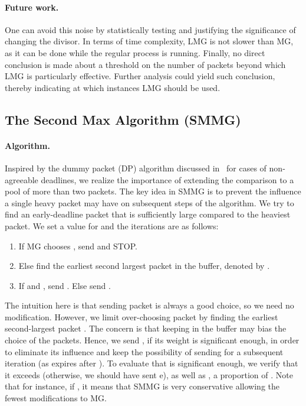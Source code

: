 \documentclass[oribibl]{llncs}
\begin{document}
\paragraph{Future work.} One can avoid this noise by statistically testing and justifying the significance of changing the divisor. In terms of time complexity, LMG is not slower than MG, as it can be done while the regular process is running. Finally, no direct conclusion is made about a threshold on the number of packets beyond which LMG is particularly effective. Further analysis could yield such conclusion, thereby indicating at which instances LMG should be used. 


\subsection {The Second Max Algorithm (SMMG)}
\paragraph{Algorithm.} Inspired by the dummy packet (DP) algorithm discussed in~\cite{li07} for cases of non-agreeable deadlines, we realize the importance of extending the comparison to a pool of more than two packets. The
key idea in SMMG is to prevent the influence a single heavy packet may have on
subsequent steps of the algorithm. We try to find an early-deadline
packet that is sufficiently large compared to the heaviest packet. We
set a value for  and the iterations are as follows: 



\begin {enumerate}
\item If MG chooses , send  and STOP.
\item Else find the earliest second largest packet in the buffer, denoted by . 
\item If  and , send . Else send .
\end {enumerate}

The intuition here is that sending packet  is always a good choice, so we need no modification. However, we limit over-choosing packet  by finding the earliest second-largest packet . The concern is that keeping  in the buffer may bias the choice of the packets. Hence, we send , if its weight is significant enough, in order to eliminate its influence and keep the possibility of sending  for a subsequent iteration (as  expires after ). To evaluate that  is significant enough, we verify that it exceeds  (otherwise, we should have sent e), as well as , a proportion of . Note that for instance, if , it means that SMMG is very conservative allowing the fewest modifications to MG.  
\end{document}

